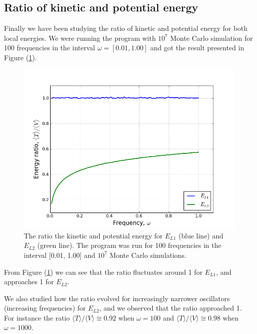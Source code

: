 \documentclass[norsk,a4paper,12pt]{article}
\begin{document}
\subsection{Ratio of kinetic and potential energy}
Finally we have been studying the ratio of kinetic and potential energy for both local energies. We were running the program with $10^7$ Monte Carlo simulation for 100 frequencies in the interval $\omega=[0.01,1.00]$ and got the result presented in Figure (\ref{fig:ratio}).

\begin{figure} [H]
    \centering
    \includegraphics[width=12cm]{energy_ratio_1e7.png}
    \caption{The ratio the kinetic and potential energy for $E_{L1}$ (blue line) and $E_{L2}$ (green line). The program was run for 100 frequencies in the interval [0.01, 1.00] and $10^7$ Monte Carlo simulations.}
    \label{fig:ratio}
\end{figure}
From Figure (\ref{fig:ratio}) we can see that the ratio fluctuates around 1 for $E_{L1}$, and approaches 1 for $E_{L2}$.

We also studied how the ratio evolved for increasingly narrower oscillators (increasing frequencies) for $E_{L2}$, and we observed that the ratio approached 1. For instance the ratio $\langle T\rangle/\langle V\rangle\cong0.92$ when $\omega=100$ and $\langle T\rangle/\langle V\rangle\cong0.98$ when $\omega=1000$.
\end{document}
